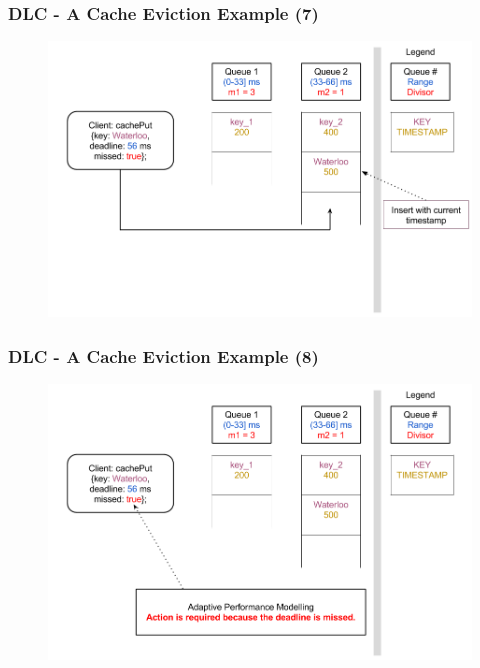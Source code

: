 \documentclass{beamer}
\begin{document}
\begin{frame}
  \frametitle{DLC - A Cache Eviction Example (7)}
  \begin{figure}
    \begin{center}
      \centerline{\includegraphics[scale=0.37]{img/DLC_V8_07.png}}
    \end{center}
  \end{figure}
\end{frame}

\begin{frame}
  \frametitle{DLC - A Cache Eviction Example (8)}
  \begin{figure}
    \begin{center}
      \centerline{\includegraphics[scale=0.37]{img/DLC_V8_08.png}}
    \end{center}
  \end{figure}
\end{frame}
\end{document}
